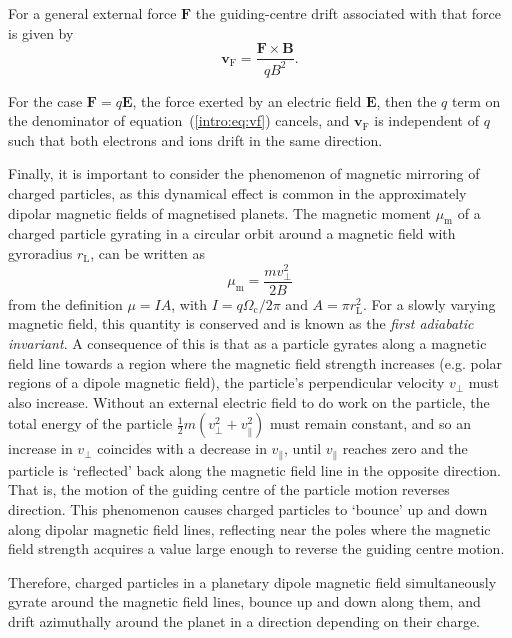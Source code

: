 For a general external force $\boldsymbol{F}$ the guiding-centre drift associated with that force is given by
\begin{equation}\label{intro:eq:vf}
\boldsymbol{v}_\mathrm{F} = \frac{\boldsymbol{F}\times\boldsymbol{B}}{qB^2}.
\end{equation}

For the case $\boldsymbol{F} = q\boldsymbol{E}$, the force exerted by an electric field $\boldsymbol{E}$, then the $q$ term on the denominator of equation~(\ref{intro:eq:vf}) cancels, and $\boldsymbol{v}_\mathrm{F}$ is independent of $q$ such that both electrons and ions drift in the same direction.

Finally, it is important to consider the phenomenon of magnetic mirroring of charged particles, as this dynamical effect is common in the approximately dipolar magnetic fields of magnetised planets. The magnetic moment $\mu_\mathrm{m}$ of a charged particle gyrating in a circular orbit around a magnetic field with gyroradius $r_\mathrm{L}$, can be written as
\begin{equation}
\mu_\mathrm{m} = \frac{mv_\perp^2}{2B}
\end{equation}
from the definition $\mu = IA$, with $I = q\Omega_\mathrm{c}/2\pi$ and $A = \pi r_\mathrm{L}^2$. For a slowly varying magnetic field, this quantity is conserved and is known as the \textit{first adiabatic invariant}. A consequence of this is that as a particle gyrates along a magnetic field line towards a region where the magnetic field strength increases (e.g. polar regions of a dipole magnetic field), the particle's perpendicular velocity $v_\perp$ must also increase. Without an external electric field to do work on the particle, the total energy of the particle $\frac{1}{2}m(v_\perp^2+v_\parallel^2)$ must remain constant, and so an increase in $v_\perp$ coincides with a decrease in $v_\parallel$, until $v_\parallel$ reaches zero and the particle is `reflected' back along the magnetic field line in the opposite direction. That is, the motion of the guiding centre of the particle motion reverses direction. This phenomenon causes charged particles to `bounce' up and down along dipolar magnetic field lines, reflecting near the poles where the magnetic field strength acquires a value large enough to reverse the guiding centre motion. 

Therefore, charged particles in a planetary dipole magnetic field simultaneously gyrate around the magnetic field lines, bounce up and down along them, and drift azimuthally around the planet in a direction depending on their charge.

